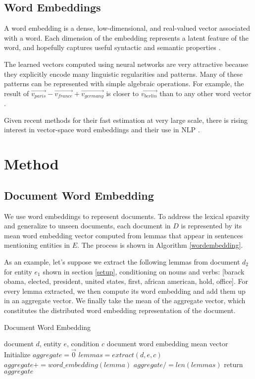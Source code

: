 \documentclass{article}
\begin{document}
\subsection{Word Embeddings}

A word embedding is a dense, low-dimensional, and real-valued vector associated with a word. Each dimension of the embedding represents a latent feature of the word, and hopefully captures useful syntactic and semantic properties \cite{Turian10wordrepresentations}.

The learned vectors computed using neural networks are very attractive because they explicitly encode many linguistic regularities and patterns. Many of these patterns can be represented with simple algebraic operations. For example, the result of $\vec{v_{paris}} - \vec{v_{france}} + \vec{v_{germany}}$ is closer to $\vec{v_{berlin}}$ than to any other word vector \cite{mikolovChen,mikolovYih}.

Given recent methods for their fast estimation at very large scale, there is rising interest in vector-space word embeddings and their use in NLP \cite{Arvind14}.

\section{Method}
\label{approach}

\subsection{Document Word Embedding}
\label{docwordemb}

We use word embeddings to represent documents. To address the lexical sparsity and generalize to unseen documents, each document in $D$ is represented by its mean word embedding vector computed from lemmas that appear in sentences mentioning entities in $E$. The process is shown in Algorithm \ref{wordembedding}. 

As an example, let's suppose we extract the following lemmas from document $d_2$ for entity $e_1$ shown in section \ref{setup}, conditioning on nouns and verbs: [barack obama, elected, president, united states, first, african american, hold, office]. For every lemma extracted, we then compute its word embedding and add them up in an aggregate vector. We finally take the mean of the aggregate vector, which constitutes the distributed word embedding representation of the document.

\begin{algorithm}[tb]
   \caption{Document Word Embedding}
   \label{wordembedding}
\begin{algorithmic}
    document $d$, entity $e$, condition $c$
    document word embedding mean vector
   \STATE Initialize $aggregate = \vec{0}$
   \STATE $lemmas = extract(d, e, c)$
   \STATE $aggregate += word\_embedding(lemma)$
   \ENDFOR
   \STATE $aggregate /= len(lemmas)$
   \STATE return $aggregate$
\end{algorithmic}
\end{algorithm}
\end{document}
